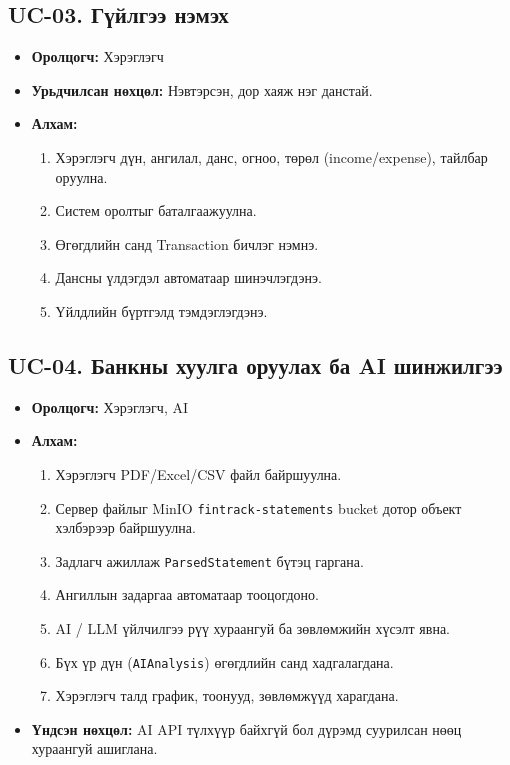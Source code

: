 \subsection{UC-03. Гүйлгээ нэмэх}
\begin{itemize}
    \item \textbf{Оролцогч:} Хэрэглэгч
    \item \textbf{Урьдчилсан нөхцөл:} Нэвтэрсэн, дор хаяж нэг данстай.
    \item \textbf{Алхам:}
    \begin{enumerate}
        \item Хэрэглэгч дүн, ангилал, данс, огноо, төрөл (income/expense), тайлбар оруулна.
        \item Систем оролтыг баталгаажуулна.
        \item Өгөгдлийн санд Transaction бичлэг нэмнэ.
        \item Дансны үлдэгдэл автоматаар шинэчлэгдэнэ.
        \item Үйлдлийн бүртгэлд тэмдэглэгдэнэ.
    \end{enumerate}
\end{itemize}

\subsection{UC-04. Банкны хуулга оруулах ба AI шинжилгээ}
\begin{itemize}
    \item \textbf{Оролцогч:} Хэрэглэгч, AI
    \item \textbf{Алхам:}
    \begin{enumerate}
        \item Хэрэглэгч PDF/Excel/CSV файл байршуулна.
        \item Сервер файлыг MinIO \texttt{fintrack-statements} bucket дотор объект хэлбэрээр байршуулна.
        \item Задлагч ажиллаж \texttt{ParsedStatement} бүтэц гаргана.
        \item Ангиллын задаргаа автоматаар тооцогдоно.
        \item AI / LLM үйлчилгээ рүү хураангуй ба зөвлөмжийн хүсэлт явна.
        \item Бүх үр дүн (\texttt{AIAnalysis}) өгөгдлийн санд хадгалагдана.
        \item Хэрэглэгч талд график, тоонууд, зөвлөмжүүд харагдана.
    \end{enumerate}
    \item \textbf{Үндсэн нөхцөл:} AI API түлхүүр байхгүй бол дүрэмд суурилсан нөөц хураангуй ашиглана.
\end{itemize}

